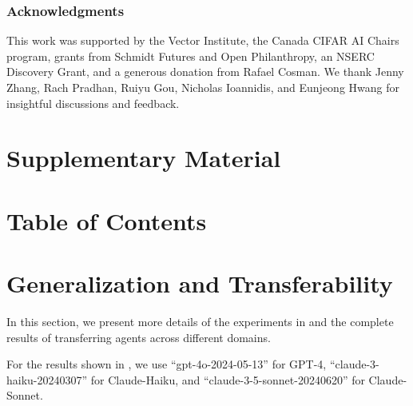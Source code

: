 \documentclass{article} %
\begin{document}
\subsubsection*{Acknowledgments}

This work was supported by the Vector Institute, the Canada CIFAR AI Chairs program, grants from Schmidt Futures and Open Philanthropy, an NSERC Discovery Grant, and a generous donation from Rafael Cosman. We thank Jenny Zhang, Rach Pradhan, Ruiyu Gou, Nicholas Ioannidis, and Eunjeong Hwang for insightful discussions and feedback.




\clearpage
\appendix




\section*{\LARGE Supplementary Material}

\vspace*{20pt}
\section*{Table of Contents}
\vspace*{-5pt}
\startcontents[sections]

\clearpage

\section{Generalization and Transferability}
\label{append_section:transfer}



In this section, we present more details of the experiments in  and the complete results of transferring agents across different domains.

For the results shown in , we use ``gpt-4o-2024-05-13'' for GPT-4, ``claude-3-haiku-20240307'' for Claude-Haiku, and ``claude-3-5-sonnet-20240620'' for Claude-Sonnet.
\end{document}

